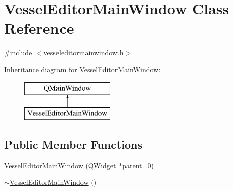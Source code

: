 \hypertarget{class_vessel_editor_main_window}{}\section{Vessel\+Editor\+Main\+Window Class Reference}
\label{class_vessel_editor_main_window}


{\ttfamily \#include $<$vesseleditormainwindow.\+h$>$}

Inheritance diagram for Vessel\+Editor\+Main\+Window\+:\begin{figure}[H]
\begin{center}
\leavevmode
\includegraphics[height=2.000000cm]{de/d50/class_vessel_editor_main_window}
\end{center}
\end{figure}
\subsection*{Public Member Functions}
\begin{DoxyCompactItemize}
\item 
\mbox{\hyperlink{class_vessel_editor_main_window_a834ff8a49a787123972e90821875ec0e}{Vessel\+Editor\+Main\+Window}} (Q\+Widget $\ast$parent=0)
\item 
\mbox{\hyperlink{class_vessel_editor_main_window_a6c3a243f206a75aac9474890137f79e9}{$\sim$\+Vessel\+Editor\+Main\+Window}} ()
\end{DoxyCompactItemize}
